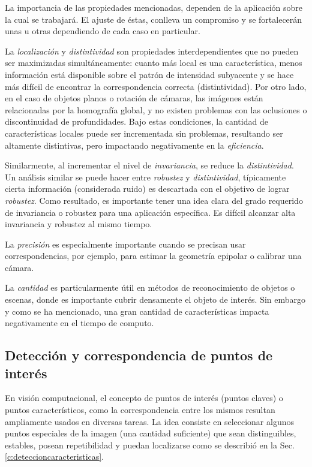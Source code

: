 La importancia de las propiedades mencionadas, dependen de la aplicación sobre la cual se trabajará. El ajuste de éstas, conlleva un compromiso y se fortalecerán unas u otras dependiendo de cada caso en particular.

La \textit{localización} y \textit{distintividad} son propiedades interdependientes que no pueden ser maximizadas simultáneamente: cuanto más local es una característica, menos información está disponible sobre el patrón de intensidad subyacente y se hace más difícil de encontrar la correspondencia correcta (distintividad). Por otro lado, en el caso de objetos planos o rotación de cámaras, las imágenes están relacionadas por la homografía global, y no existen problemas con las oclusiones o discontinuidad de profundidades. Bajo estas condiciones, la cantidad de características locales puede ser incrementada sin problemas, resultando ser altamente distintivas, pero impactando negativamente en la \textit{eficiencia}.

Similarmente, al incrementar el nivel de \textit{invariancia}, se reduce la \textit{distintividad}. Un análisis similar se puede hacer entre \textit{robustez} y \textit{distintividad}, típicamente cierta información (considerada ruido) es descartada con el objetivo de lograr \textit{robustez}. Como resultado, es importante tener una idea clara del grado requerido de invariancia o robustez para una aplicación específica. Es difícil alcanzar alta invariancia y robustez al mismo tiempo.

La \textit{precisión} es especialmente importante cuando se precisan usar correspondencias, por ejemplo, para estimar la geometría epipolar o calibrar una cámara.

La \textit{cantidad} es particularmente útil en métodos de reconocimiento de objetos o escenas, donde es importante cubrir densamente el objeto de interés. Sin embargo y como se ha mencionado, una gran cantidad de características impacta negativamente en el tiempo de computo.
\subsection{Detección y correspondencia de puntos de interés}
En visión computacional, el concepto de puntos de interés (puntos claves) o puntos característicos, como la correspondencia entre los mismos resultan ampliamente usados en diversas tareas. La idea consiste en seleccionar algunos puntos especiales de la imagen (una cantidad suficiente) que sean distinguibles, estables, posean repetibilidad y puedan localizarse como se describió en la Sec. \ref{c:deteccioncaracteristicas}.

